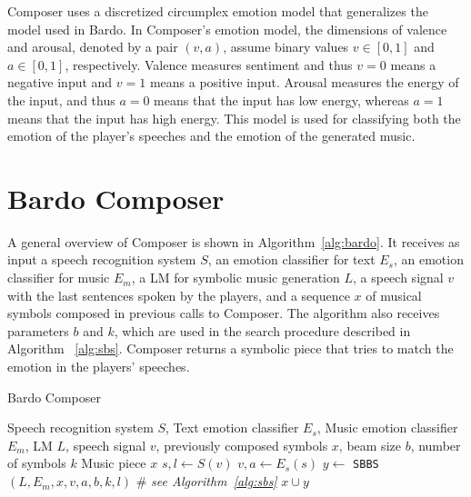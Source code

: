 Composer uses a discretized circumplex emotion model \cite{russell1980circumplex} that generalizes the model used in Bardo. In Composer's emotion model, the dimensions of valence and arousal, denoted by a pair $(v,a)$, assume  binary values $v \in [0, 1]$ and $a \in [0, 1]$, respectively. Valence measures sentiment and thus $v = 0$ means a negative input and $v = 1$ means a positive input. Arousal measures the energy of the input, and thus $a = 0$ means that the input has low energy, whereas $a = 1$ means that the input has high energy. This model is used for classifying both the emotion of the player's speeches and the emotion of the generated music.

\section{Bardo Composer}

A general overview of Composer is shown in Algorithm~\ref{alg:bardo}. It receives as input a speech recognition system $S$, an emotion classifier for text $E_s$, an emotion classifier for music $E_m$, a LM for symbolic music generation $L$, a speech signal $v$ with the last sentences spoken by the players, and a sequence $x$ of musical symbols composed in previous calls to Composer. The algorithm also receives parameters $b$ and $k$, which are used in the search procedure described in Algorithm ~\ref{alg:sbs}. Composer returns a symbolic piece that tries to match the emotion in the players' speeches.

\begin{algorithm}[t]

\caption{Bardo Composer}
\label{alg:bardo}
\begin{algorithmic}[1]
\REQUIRE Speech recognition system $S$, Text emotion classifier $E_s$, Music emotion classifier $E_m$, LM $L$, speech signal $v$, previously composed symbols $x$, beam size $b$, number of symbols $k$
\ENSURE Music piece $x$
\STATE $s, l \gets S(v)$ \label{line:voice2text}
\STATE $v, a \gets E_s(s)$ \label{line:emotion_classification}
\STATE $y \gets$ \texttt{SBBS}$(L, E_m, x, v, a, b, k, l)$ \# \emph{see Algorithm~\ref{alg:sbs}} \label{line:sbs}
\RETURN $x \cup y$ \label{line:generation2}
\end{algorithmic}
\end{algorithm}

